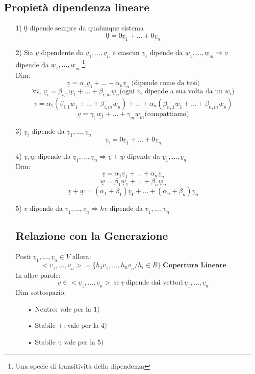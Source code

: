 \subsection{Propietà dipendenza lineare}
\begin{itemize}
\item[1)] $\underline{0}$ dipende sempre da qualunque sistema
$$ \underline{0} = 0\underline{v}_1+...+0\underline{v}_n $$
\item[2)] Sia $\underline{v}$ dipendente da $\underline{v}_1,...,\underline{v}_n$ e ciascun $\underline{v}_i$ dipende da $\underline{w}_1,...,\underline{w}_m \Rightarrow \underline{v} $ dipende da $\underline{w}_1,...,\underline{w}_m$ \footnote{Una specie di transitività della dipendenza} \\
Dim: \\
$$ \underline{v} = \alpha_1\underline{v}_1 + ... + \alpha_n\underline{v}_n \; \text{(dipende come da tesi)}$$
$$ \forall i, \: \underline{v}_i = \beta_{i,1} \underline{w}_1 + ... + \beta_{i,m} \underline{w}_n \text{(ogni $v_i$ dipende a sua volta da un $w_i$)}$$
$$ \underline{v} = \alpha_1(\beta_{i,1} \underline{w}_1 + ... + \beta_{i,m} \underline{w}_n) + ... + \alpha_n (\beta_{n,1} \underline{w}_1 + ... + \beta_{n,m} \underline{w}_n) $$
$$ \underline{v} = \gamma_1\underline{w_1} + ... + \gamma_m \underline{w}_m \text{(compattiamo)}$$
\item[3)] $\underline{v}_i$ dipende da $\underline{v}_1,...,\underline{v}_n$ 
$$ \underline{v}_i = 0\underline{v}_1 + ... + 0\underline{v}_n $$
\item[4)] $ \underline{v}, \underline{w} $ dipende da $\underline{v}_1,...,\underline{v}_n \Rightarrow \underline{v}+\underline{w} $ dipende da $\underline{v}_1,...,\underline{v}_n$\\
Dim:\\
$$ \underline{v} = \alpha_1\underline{v}_1 + ... + \alpha_n\underline{v}_n $$
$$ \underline{w} = \beta_1\underline{w}_1 + ... + \beta_n\underline{w}_n $$
$$ \underline{v} + \underline{w} = (\alpha_1 + \beta_1)\underline{v}_1 + ... + (\alpha_n + \beta_n)\underline{v}_n $$
\item[5)] $ \underline{v} $ dipende da $\underline{v}_1,...,\underline{v}_n \Rightarrow h\underline{v} $ dipende da $\underline{v}_1,...,\underline{v}_n$

\subsection{Relazione con la Generazione}
Posti $\underline{v}_1,...,\underline{v}_n \in V$ allora:
$$ <\underline{v}_1,...,\underline{v}_n> = \{h_1\underline{v}_1,...,h_n\underline{v}_n / h_i \in R \} \; \textbf{Copertura Lineare}$$
In altre parole:
$$ \underline{v} \in <\underline{v}_1,...,\underline{v}_n> \:\text{se}\: \underline{v} \: \text{dipende dai vettori} \: \underline{v}_1,...,\underline{v}_n  $$
Dim sottospazio:
\begin{itemize}
\item[•] Neutro: vale per la $1)$ 
\item[•] Stabile $+$: vale per la $4)$
\item[•] Stabile $\cdot$: vale per la $5)$
\end{itemize}


\end{itemize}
